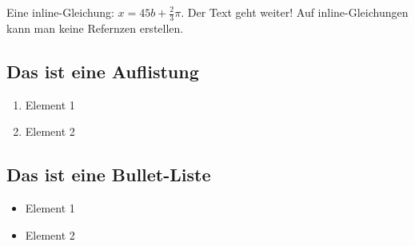 \documentclass[12pt,oneside]{article}
\begin{document}
Eine inline-Gleichung: $x=45b + \frac{2}{3}\pi$. Der Text geht weiter! Auf inline-Gleichungen kann man keine Refernzen erstellen.

\subsection{Das ist eine Auflistung}
\begin{enumerate}
\item Element 1
\item Element 2
\end{enumerate}

\subsection{Das ist eine Bullet-Liste}
\begin{itemize}
\item Element 1
\item Element 2
\end{itemize}
\end{document}
